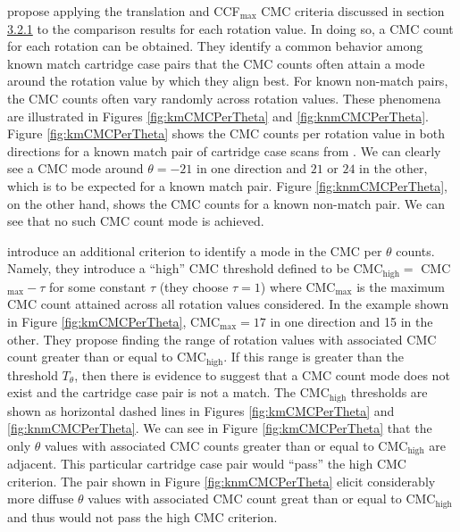 \citet{tong_improved_2015} propose applying the translation and
CCF\(_{\max}\) CMC criteria discussed in section
\protect\hyperlink{initialMethod}{3.2.1} to the comparison results for
each rotation value. In doing so, a CMC count for each rotation can be
obtained. They identify a common behavior among known match cartridge
case pairs that the CMC counts often attain a mode around the rotation
value by which they align best. For known non-match pairs, the CMC
counts often vary randomly across rotation values. These phenomena are
illustrated in Figures \ref{fig:kmCMCPerTheta} and
\ref{fig:knmCMCPerTheta}. Figure \ref{fig:kmCMCPerTheta} shows the CMC
counts per rotation value in both directions for a known match pair of
cartridge case scans from \citet{fadul_empirical_nodate}. We can clearly
see a CMC mode around \(\theta = -21\) in one direction and \(21\) or
\(24\) in the other, which is to be expected for a known match pair.
Figure \ref{fig:knmCMCPerTheta}, on the other hand, shows the CMC counts
for a known non-match pair. We can see that no such CMC count mode is
achieved.

\citet{tong_improved_2015} introduce an additional criterion to identify
a mode in the CMC per \(\theta\) counts. Namely, they introduce a
``high'' CMC threshold defined to be CMC\(_{\text{high}} =\)
CMC\(_{\max} - \tau\) for some constant \(\tau\) (they choose
\(\tau = 1\)) where CMC\(_{\max}\) is the maximum CMC count attained
across all rotation values considered. In the example shown in Figure
\ref{fig:kmCMCPerTheta}, CMC\(_{\max} = 17\) in one direction and 15 in
the other. They propose finding the range of rotation values with
associated CMC count greater than or equal to CMC\(_{\text{high}}\). If
this range is greater than the threshold \(T_\theta\), then there is
evidence to suggest that a CMC count mode does not exist and the
cartridge case pair is not a match. The CMC\(_{\text{high}}\) thresholds
are shown as horizontal dashed lines in Figures \ref{fig:kmCMCPerTheta}
and \ref{fig:knmCMCPerTheta}. We can see in Figure
\ref{fig:kmCMCPerTheta} that the only \(\theta\) values with associated
CMC counts greater than or equal to CMC\(_{\text{high}}\) are adjacent.
This particular cartridge case pair would ``pass'' the high CMC
criterion. The pair shown in Figure \ref{fig:knmCMCPerTheta} elicit
considerably more diffuse \(\theta\) values with associated CMC count
great than or equal to CMC\(_{\text{high}}\) and thus would not pass the
high CMC criterion.

